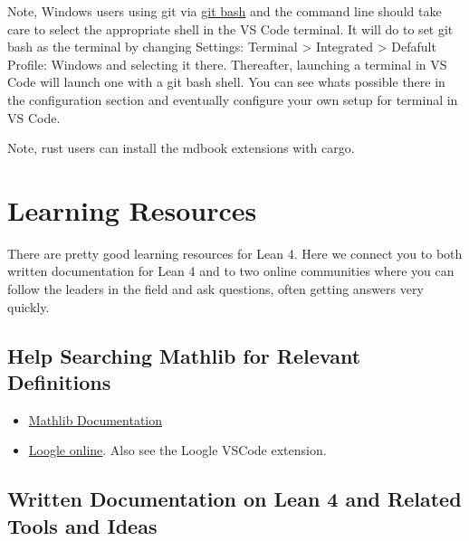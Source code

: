 \documentclass{book}
\providecommand{\tightlist}{%
  \setlength{\itemsep}{0pt}\setlength{\parskip}{0pt}}
\begin{document}
Note, Windows users using git via \href{https://gitforwindows.org}{git bash} and the command line should take
care to select the appropriate shell in the VS Code terminal. It will do to
set git bash as the terminal by changing Settings: Terminal \textgreater{} Integrated \textgreater{}
Defafult Profile: Windows and selecting it there. Thereafter, launching a
terminal in VS Code will launch one with a git bash shell. You can see what\textquotesingle s
possible there in the configuration section and eventually configure your own
setup for terminal in VS Code.

Note, rust users can install the mdbook extensions with cargo.

\hypertarget{pandoc.profile.debug__pandoc__debug__src__resources.md}{}
\hypertarget{pandoc.profile.debug__pandoc__debug__src__resources.md__learning-resources}{%
\chapter*{Learning Resources}\label{pandoc.profile.debug__pandoc__debug__src__resources.md__learning-resources}}

There are pretty good learning resources for Lean 4. Here we
connect you to both written documentation for Lean 4 and to two
online communities where you can follow the leaders in the field
and ask questions, often getting answers very quickly.

\hypertarget{pandoc.profile.debug__pandoc__debug__src__resources.md__help-searching-mathlib-for-relevant-definitions}{%
\section*{Help Searching Mathlib for Relevant Definitions}\label{pandoc.profile.debug__pandoc__debug__src__resources.md__help-searching-mathlib-for-relevant-definitions}}

\begin{itemize}
\tightlist
\item
  \href{https://leanprover-community.github.io/mathlib4_docs/index.html}{Mathlib Documentation}
\item
  \href{https://loogle.lean-lang.org/}{Loogle online}. Also see the Loogle VSCode extension.
\end{itemize}

\hypertarget{pandoc.profile.debug__pandoc__debug__src__resources.md__written-documentation-on-lean-4-and-related-tools-and-ideas}{%
\section*{Written Documentation on Lean 4 and Related Tools and Ideas}\label{pandoc.profile.debug__pandoc__debug__src__resources.md__written-documentation-on-lean-4-and-related-tools-and-ideas}}
\end{document}
